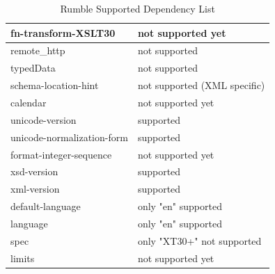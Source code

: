 \begin{table}
\begin{tabular}{|l|l|}
		\hline
		fn-transform-XSLT30                & not supported yet             \\ 
		\hline
		remote\_http                       & not supported                 \\ 
		\hline
		typedData                          & not supported                 \\ 
		\hline
		schema-location-hint               & not supported (XML specific)  \\ 
		\hline
		calendar                           & not supported yet             \\ 
		\hline
		unicode-version                    & supported                     \\ 
		\hline
		unicode-normalization-form         & supported                     \\ 
		\hline
		format-integer-sequence            & not supported yet             \\ 
		\hline
		xsd-version                        & supported                     \\ 
		\hline
		xml-version                        & supported                     \\ 
		\hline
		default-language                   & only "en" supported            \\ 
		\hline
		language                           & only "en" supported            \\ 
		\hline
		spec                               & only "XT30+" not supported    \\ 
		\hline
		limits                             & not supported yet             \\
		\hline
	\end{tabular}
	\caption{Rumble Supported Dependency List}
	\label{tab:Phase2_DependencyList}
\end{table}